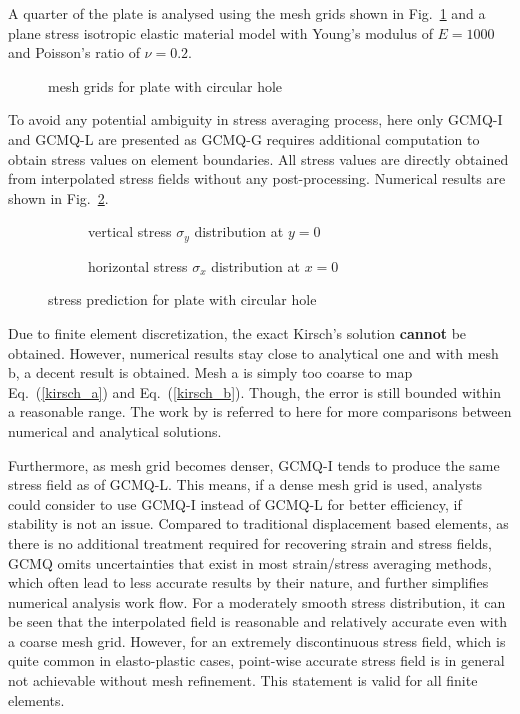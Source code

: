 \documentclass[3p,sort&compress,review,11pt]{elsarticle}
\newcommand*{\figref}[1]{Fig.~\ref{#1}}
\newcommand*{\eqsref}[1]{Eq.~(\ref{#1})}
\begin{document}
A quarter of the plate is analysed using the mesh grids shown in \figref{fig:plate_with_hole_mesh} and a plane stress isotropic elastic material model with Young's modulus of $E=1000$ and Poisson's ratio of $\nu=0.2$.
\begin{figure}[htb]
\centering\scriptsize

\caption{mesh grids for plate with circular hole}\label{fig:plate_with_hole_mesh}
\end{figure}
To avoid any potential ambiguity in stress averaging process, here only GCMQ-I and GCMQ-L are presented as GCMQ-G requires additional computation to obtain stress values on element boundaries. All stress values are directly obtained from interpolated stress fields without any post-processing. Numerical results are shown in \figref{fig:plate_with_hole_stress}.
\begin{figure}[htb]
\centering\scriptsize
\begin{subfigure}[b]{.49\textwidth}\centering

\caption{vertical stress $\sigma_y$ distribution at $y=0$}
\end{subfigure}\quad
\begin{subfigure}[b]{.49\textwidth}\centering

\caption{horizontal stress $\sigma_x$ distribution at $x=0$}
\end{subfigure}
\caption{stress prediction for plate with circular hole}\label{fig:plate_with_hole_stress}
\end{figure}
Due to finite element discretization, the exact Kirsch's solution \textbf{cannot} be obtained. However, numerical results stay close to analytical one and with mesh b, a decent result is obtained. Mesh a is simply too coarse to map \eqsref{kirsch_a} and \eqsref{kirsch_b}. Though, the error is still bounded within a reasonable range. The work by \citet{Madeo2014} is referred to here for more comparisons between numerical and analytical solutions.

Furthermore, as mesh grid becomes denser, GCMQ-I tends to produce the same stress field as of GCMQ-L. This means, if a dense mesh grid is used, analysts could consider to use GCMQ-I instead of GCMQ-L for better efficiency, if stability is not an issue. Compared to traditional displacement based elements, as there is no additional treatment required for recovering strain and stress fields, GCMQ omits uncertainties that exist in most strain/stress averaging methods, which often lead to less accurate results by their nature, and further simplifies numerical analysis work flow. For a moderately smooth stress distribution, it can be seen that the interpolated field is reasonable and relatively accurate even with a coarse mesh grid. However, for an extremely discontinuous stress field, which is quite common in elasto-plastic cases, point-wise accurate stress field is in general not achievable without mesh refinement. This statement is valid for all finite elements.
\end{document}
